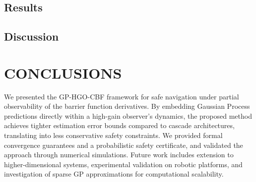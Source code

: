 \documentclass[letterpaper, 10 pt, conference]{ieeeconf}
\begin{document}
\subsection{Results}


\subsection{Discussion}


\section{CONCLUSIONS}
\label{sec:conclusions}

We presented the GP-HGO-CBF framework for safe navigation under partial observability of the barrier function derivatives. By embedding Gaussian Process predictions directly within a high-gain observer's dynamics, the proposed method achieves tighter estimation error bounds compared to cascade architectures, translating into less conservative safety constraints. We provided formal convergence guarantees and a probabilistic safety certificate, and validated the approach through numerical simulations. Future work includes extension to higher-dimensional systems, experimental validation on robotic platforms, and investigation of sparse GP approximations for computational scalability.

\addtolength{\textheight}{-12cm}
\end{document}
